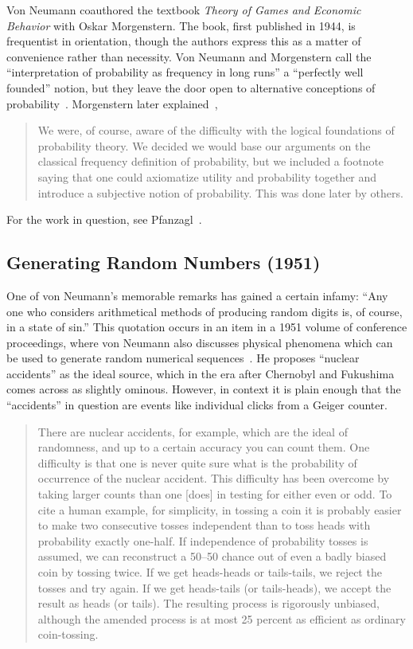 \documentclass[aps,pra,superscriptaddress,12pt,tightenlines,nofootinbib]{revtex4-2}
\newcommand{\booktitle}{\textsl}
\begin{document}
Von Neumann coauthored the textbook \booktitle{Theory of Games and
  Economic Behavior} with Oskar Morgenstern.  The book, first
published in 1944, is frequentist in orientation, though the authors
express this as a matter of convenience rather than necessity.  Von
Neumann and Morgenstern call the ``interpretation of probability as
frequency in long runs'' a ``perfectly well founded'' notion, but they
leave the door open to alternative conceptions of
probability~\cite{VN-GAME}.  Morgenstern later
explained~\cite{Morgenstern1976},
\begin{quotation}
\noindent We were, of course, aware of the difficulty with the logical
foundations of probability theory.  We decided we would base our
arguments on the classical frequency definition of probability, but we
included a footnote saying that one could axiomatize utility and
probability together and introduce a subjective notion of
probability.  This was done later by others.
\end{quotation}
For the work in question, see Pfanzagl~\cite{Pfanzagl1959,
  Pfanzagl1967, Pfanzagl1971}.

\subsection{Generating Random Numbers (1951)}

One of von Neumann's memorable remarks has gained a certain infamy:
``Any one who considers arithmetical methods of producing random
digits is, of course, in a state of sin.''  This quotation occurs in
an item in a 1951 volume of conference proceedings, where von Neumann
also discusses physical phenomena which can be used to generate random
numerical sequences~\cite{VN-RAND}.  He proposes ``nuclear accidents''
as the ideal source, which in the era after Chernobyl and Fukushima
comes across as slightly ominous.  However, in context it is plain
enough that the ``accidents'' in question are events like individual
clicks from a Geiger counter.
\begin{quotation}
\noindent There are nuclear accidents, for example, which are the
ideal of randomness, and up to a certain accuracy you can count them.
One difficulty is that one is never quite sure what is the probability
of occurrence of the nuclear accident.  This difficulty has been
overcome by taking larger counts than one [does] in testing for either
even or odd.  To cite a human example, for simplicity, in tossing a
coin it is probably easier to make two consecutive tosses independent
than to toss heads with probability exactly one-half.  If independence
of probability tosses is assumed, we can reconstruct a 50--50 chance
out of even a badly biased coin by tossing twice.  If we get
heads-heads or tails-tails, we reject the tosses and try again.  If we
get heads-tails (or tails-heads), we accept the result as heads (or
tails).  The resulting process is rigorously unbiased, although the
amended process is at most 25 percent as efficient as ordinary
coin-tossing.
\end{quotation}
\end{document}

